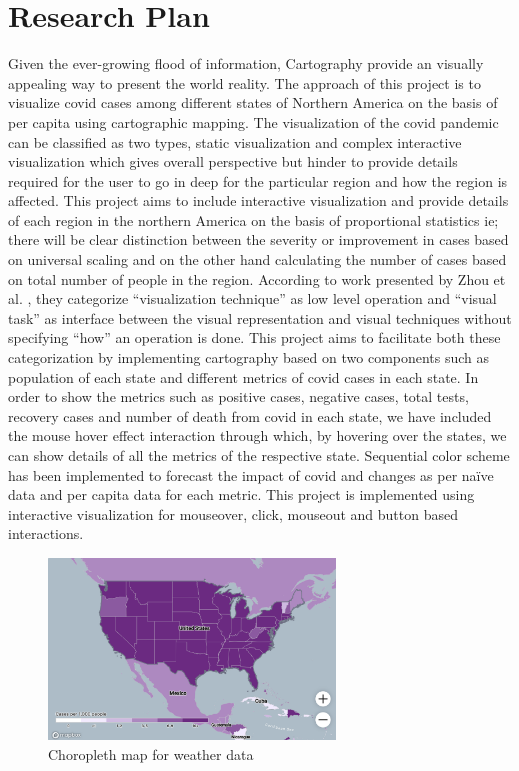 \section{Research Plan} 
\label{sec:research}

Given the ever-growing flood of information, Cartography provide an visually appealing way to present the world reality. The approach of this project is to visualize covid cases among different states of Northern America on the basis of per capita using cartographic mapping. 
The visualization of the covid pandemic can be classified as two types, static visualization \cite{WaPo} and complex interactive visualization \cite{CovViz} which gives overall perspective but hinder to provide details required for the user  to go in deep for the particular region and how the region is affected. This project aims to include interactive visualization and provide details of each region in the northern America on the basis of proportional statistics ie; there will be clear distinction between the severity or improvement in cases based on universal scaling and on the other hand calculating the number of cases based on total number of people in the region. 
According to work presented by Zhou et al. \cite{Zhou}, they categorize “visualization technique” as low level operation and “visual task” as interface between the visual representation and visual techniques without specifying “how” an operation is done. This project aims to facilitate both these categorization by implementing cartography based on two components such as population of each state and different metrics of covid cases in each state. In order to show the metrics such as positive cases, negative cases, total tests, recovery cases and number of death from covid in each state, we have included the mouse hover effect interaction through which, by hovering over the states, we can show details of all the metrics of the respective state. Sequential color scheme has been implemented to forecast the impact of covid and changes as per naïve data and per capita data for each metric. This project is implemented using interactive visualization for mouseover, click, mouseout and button based interactions.

\begin{figure}[h]
 \centering %
 \includegraphics[width=3in]{figs/Weatherdata.png}
 \caption{Choropleth map for weather data \cite{Weather}}
 \label{fig:weather}
\end{figure}

